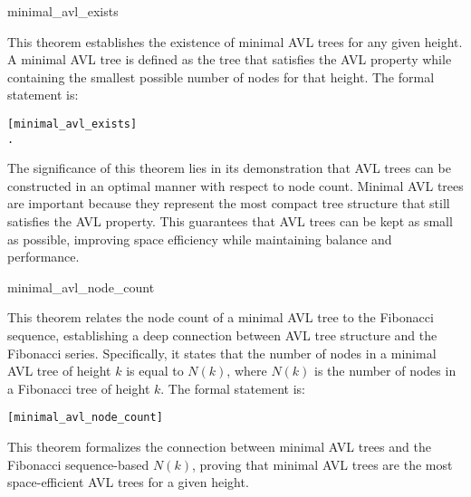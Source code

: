 	\begin{thm}{minimal\_avl\_exists}

    This theorem establishes the existence of minimal AVL trees for any given height. A minimal AVL tree is defined as the tree that satisfies the AVL property while containing the smallest possible number of nodes for that height. The formal statement is:
    
    \begin{alltt}
    	[minimal_avl_exists]
    	\HOLTokenTurnstile{} \HOLSymConst{\HOLTokenExists{}}.   \HOLSymConst{\HOLTokenConj{}}   \HOLSymConst{=} 
    \end{alltt}
    
    
    \end{thm}
    The significance of this theorem lies in its demonstration that AVL trees can be constructed in an optimal manner with respect to node count. Minimal AVL trees are important because they represent the most compact tree structure that still satisfies the AVL property. This guarantees that AVL trees can be kept as small as possible, improving space efficiency while maintaining balance and performance.
    

    \begin{thm}{minimal\_avl\_node\_count}

    This theorem relates the node count of a minimal AVL tree to the Fibonacci sequence, establishing a deep connection between AVL tree structure and the Fibonacci series. Specifically, it states that the number of nodes in a minimal AVL tree of height \( k \) is equal to \( N(k) \), where \( N(k) \) is the number of nodes in a Fibonacci tree of height \( k \). The formal statement is:
    
    \begin{alltt}
    	[minimal_avl_node_count]
    	\HOLTokenTurnstile{}   \HOLSymConst{\HOLTokenConj{}}   \HOLSymConst{=}  \HOLSymConst{\HOLTokenImp{}}   \HOLSymConst{=}  
    \end{alltt}
    
    
    \end{thm}
    This theorem formalizes the connection between minimal AVL trees and the Fibonacci sequence-based \( N(k) \), proving that minimal AVL trees are the most space-efficient AVL trees for a given height.
    

